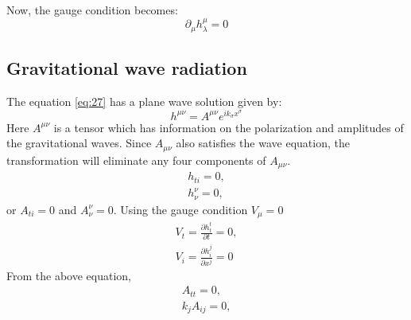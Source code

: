 \documentclass{ttuthes2007}
\begin{document}
Now, the gauge condition becomes:
\begin{equation}\label{eq:28}
\partial _\mu h^\mu _\lambda = 0
\end{equation}


\subsection{Gravitational wave radiation}
The equation \ref{eq:27} has a plane wave solution given by:
\begin{equation} \label{eq:30}
h^{\mu \nu} = A^{\mu \nu}e^{ik_\sigma x^\sigma}
\end{equation}
Here $A^{\mu \nu}$ is a tensor which has information on
the polarization and amplitudes of the gravitational waves.
Since $A_{\mu \nu}$ also satisfies the wave equation, the transformation will
eliminate any four components of $A_{\mu \nu}$.
\begin{equation}
\begin{aligned}
h_{ti}=0, \\
h^\nu_\nu =0,
\end{aligned}
\end{equation}
or $A_{ti}=0$ and $A_\nu ^\nu=0$. Using the gauge condition $V_\mu =0$
\begin{equation}
\begin{aligned}
V_t=\frac{\partial h^t _t}{\partial t}=0,\\
V_i=\frac{\partial h^j _i}{\partial x^j}=0
\end{aligned}
\end{equation}
From the above equation,
\begin{equation}                                                                
\begin{aligned} 
A_{tt}=0, \\
k_j A_{ij}=0,
\end{aligned}                                                                   
\end{equation} 
\end{document}
